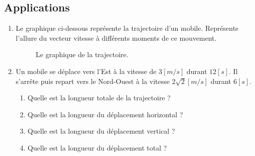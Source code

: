 \newpage

\subsection{Applications}
\begin{enumerate}
    \item Le graphique ci-dessous représente la trajectoire d'un mobile. Représente l'allure du vecteur vitesse à différents moments de ce mouvement.
          \begin{figure}[!ht]
              \centering
              \resizebox{.8\linewidth}{!}{}
              \caption{Le graphique de la trajectoire.}
              \label{exercice_deplacement_2}
          \end{figure}
    \item Un mobile se déplace vers l'Est à la vitesse de \(\num{3} \unit{[m/s]}\) durant \(12 \unit{[s]}\). Il s'arrête puis repart vers le Nord-Ouest à la vitesse \(2 \sqrt{2} \unit{[m/s]}\) durant \(6\unit{[s]}\).
          \begin{enumerate}[label=\alph*)]
              \item Quelle est la longueur totale de la trajectoire ?
              \item Quelle est la longueur du déplacement horizontal ?
              \item Quelle est la longueur du déplacement vertical ?
              \item Quelle est la longueur du déplacement total ?
          \end{enumerate}
\end{enumerate}

